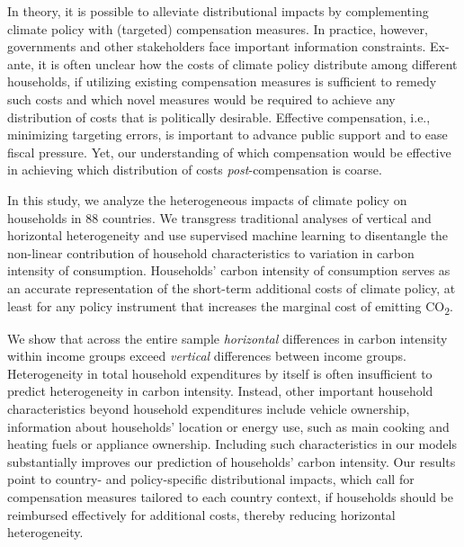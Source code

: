 \documentclass[12pt, a4paper]{article}
\begin{document}
In theory, it is possible to alleviate distributional impacts by complementing climate policy with (targeted) compensation measures. In practice, however, governments and other stakeholders face important information constraints. Ex-ante, it is often unclear how the costs of climate policy distribute among different households, if utilizing existing compensation measures is sufficient to remedy such costs and which novel measures would be required to achieve any distribution of costs that is politically desirable. Effective compensation, i.e., minimizing targeting errors, is important to advance public support and to ease fiscal pressure. Yet, our understanding of which compensation would be effective in achieving which distribution of costs \textit{post}-compensation is coarse.

In this study, we analyze the heterogeneous impacts of climate policy on households in 88 countries. We transgress traditional analyses of vertical and horizontal heterogeneity and use supervised machine learning to disentangle the non-linear contribution of household characteristics to variation in carbon intensity of consumption. Households' carbon intensity of consumption serves as an accurate representation of the short-term additional costs of climate policy, at least for any policy instrument that increases the marginal cost of emitting CO\textsubscript{2}.

We show that across the entire sample \textit{horizontal} differences in carbon intensity within income groups exceed \textit{vertical} differences between income groups. Heterogeneity in total household expenditures by itself is often insufficient to predict heterogeneity in carbon intensity. Instead, other important household characteristics beyond household expenditures include vehicle ownership, information about households' location or energy use, such as main cooking and heating fuels or appliance ownership. Including such characteristics in our models substantially improves our prediction of households' carbon intensity. Our results point to country- and policy-specific distributional impacts, which call for compensation measures tailored to each country context, if households should be reimbursed effectively for additional costs, thereby reducing horizontal heterogeneity. 
\end{document}
